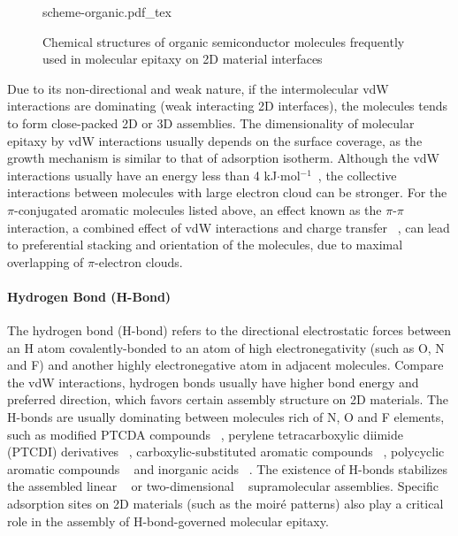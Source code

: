 \begin{figure}[h]
  \centering
  {scheme-organic.pdf_tex}
  \caption{%
    \label{fig:intro-formula}
    Chemical structures of organic semiconductor molecules frequently
    used in molecular epitaxy on 2D material interfaces }
\end{figure}

Due to its non-directional and weak nature, if the
intermolecular vdW interactions are dominating (\ie weak
interacting 2D interfaces), the molecules tends to form close-packed
2D or 3D assemblies. The dimensionality of molecular
epitaxy by vdW interactions usually depends on the surface
coverage, as the growth mechanism is similar to that of
adsorption isotherm. Although the vdW interactions usually have an
energy less than 4 kJ\(\cdot\)mol\(^{-1}\)~\autocite{Israelachvili_2011_book}, the collective
interactions between molecules with large electron cloud can be
stronger. For the \(\pi\)-conjugated aromatic molecules listed above,
an effect known as the \(\pi\)-\(\pi\) interaction, a combined effect
of vdW interactions and charge transfer ~\autocite{Hunter_1990_pi,Ortmann_2005_long_range}, can
lead to preferential stacking and orientation of the molecules, due to
maximal overlapping of \(\pi\)-electron clouds.


\paragraph{Hydrogen Bond (H-Bond)}

The hydrogen bond (H-bond) refers to the directional electrostatic
forces between an H atom covalently-bonded to an atom of high
electro\-negativity (such as O, N and F) and another highly
electro\-negative atom in adjacent molecules. Compare the vdW
interactions, hydrogen bonds usually have higher bond energy and
preferred direction, which favors certain assembly structure on 2D
materials. The H-bonds are usually dominating between molecules rich
of N, O and F elements, such as modified PTCDA compounds
~\autocite{Mura_2010_DFT_H_bond_PTCDA_gr,Karmel_2014_assembl_hetero_gr},
perylene tetra\-carboxylic diimide (PTCDI) derivatives
~\autocite{Pollard_2010_hbond_assembly_gr,Karmel_2014_PTCDI_gr},
carboxylic-substituted aromatic compounds
~\autocite{Rochefort_2009_aro_graphene_mech,Addou_2013_TPA_gr}, polycyclic
aromatic compounds
~\autocite{Kozlov_2012_polyaro_gr,Roos_2011_BTP_gr,Meier_2010_polycyclic_gr}
and inorganic acids ~\autocite{Prado_2011_2D_acid_gr}. The existence of
H-bonds stabilizes the assembled  linear
~\autocite{Pollard_2010_hbond_assembly_gr} or two-dimensional
~\autocite{Prado_2011_2D_acid_gr} supra\-molecular assemblies. Specific
adsorption sites on 2D materials (such as the moiré patterns) also
play a critical role in the assembly of H-bond-governed molecular
epitaxy.


